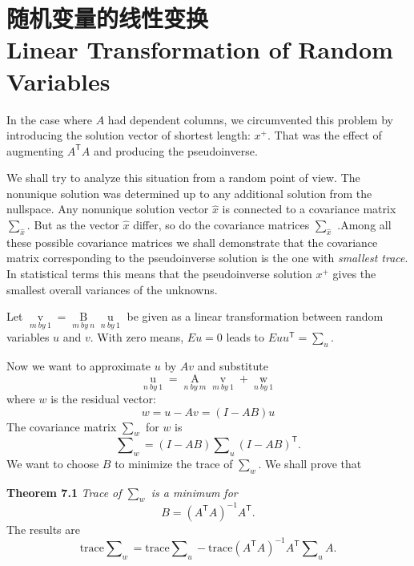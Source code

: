 \section[随机变量的线性变换]{随机变量的线性变换\\Linear Transformation of Random Variables}	
\par\noindent
In the case where $A$ had dependent columns, we circumvented this problem by introducing
the solution vector of shortest length: $x^+$. That was the effect of augmenting $A^\mathsf{T}A$ and  producing the pseudoinverse.
\par
We shall try to analyze this situation from a random point of view. The nonunique
solution was determined up to any additional solution from the nullspace. Any nonunique
solution vector $\hat{x}$ is connected to a covariance matrix $\sum_{\hat{x}}$. But as the vector $\hat{x}$ differ, so do the covariance matrices $\sum_{\hat{x}}$ .Among all these possible covariance matrices we shall demonstrate that the covariance matrix corresponding to the pseudoinverse solution is the  one with \emph{smallest trace}. In statistical terms this means that the pseudoinverse solution $x^+$ gives the smallest overall variances of the unknowns.
\par
Let $\mathop{v}\limits_{m\ by\ 1} = \mathop{B}\limits_{m\ by\ n}\mathop{u}\limits_{n\ by\ 1}$ be given as a linear transformation between random variables $u$ and $v$. With zero means, $E{u} = 0$ leads to $E{uu^\mathsf{T}} = \sum_u$.
\par
Now we want to approximate $u$ by $Av$ and substitute
\begin{equation*}
\mathop{u}\limits_{n\ by\ 1}
=\mathop{A}\limits_{n\ by\ m}\mathop{v}\limits_{m\ by\ 1} + \mathop{w}\limits_{n\ by\ 1}
\end{equation*}
where $w$ is the residual vector:
\begin{equation}
w
=u - Av = (I - AB)u
\end{equation}
The covariance matrix $\sum_w$ for $w$ is
\begin{equation}
\sum\nolimits_w
=(I - AB)\sum\nolimits_u(I - AB)^\mathsf{T}.
\end{equation}
We want to choose $B$ to minimize the trace of $\sum_w$. We shall prove that
\par\noindent
\textbf{Theorem 7.1} \emph{Trace of $\sum_w$ is a minimum for}
\begin{equation}
B
=(A^\mathsf{T}A)^{-1}A^\mathsf{T}.
\end{equation}
The results are
\begin{equation}
\text{trace} \sum\nolimits_w
=\text{trace} \sum\nolimits_u - \text{trace}(A^\mathsf{T}A)^{-1}A^\mathsf{T}\sum\nolimits_uA.
\end{equation}
